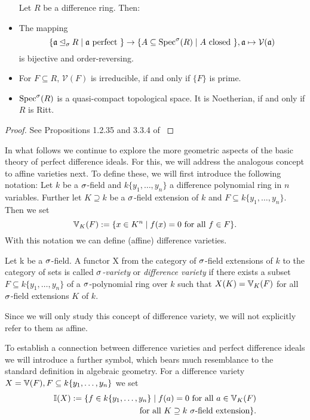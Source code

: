 \begin{prop}
\begin{itemize}
Let $R$ be a difference ring. Then: 
\item The mapping $$\{ \mathfrak{a} \unlhd_{\sigma} R \mid \mathfrak{a}\text{ perfect }\} \rightarrow \{ A \subseteq \operatorname{Spec}^\sigma(R) \mid A \text{ closed }\}, \mathfrak{a} \mapsto \mathcal{V}(\mathfrak{a})$$
 is bijective and order-reversing.
\item For $F \subseteq R$,  $\mathcal{V}(F)$ is irreducible, if and only if $\{F\}$ is prime.
\item $\operatorname{Spec}^\sigma(R)$ is a quasi-compact topological space. It is Noetherian, if and only if $R$ is Ritt.
\end{itemize}
\begin{proof} See Propositions 1.2.35 and 3.3.4 of \cite{wibmer} \end{proof}
\end{prop}

In what follows we continue to explore the more geometric aspects of the basic theory of perfect difference ideals.
For this, we will address the analogous concept to affine varieties next. To define these, we will first introduce the following notation:
Let $k$ be a $\sigma$-field and $k\{y_1,\ldots,y_n\}$ a difference polynomial ring in $n$ variables. Further let $K \supseteq k$ be a $\sigma$-field extension of $k$ and $F \subseteq k\{y_1,\ldots,y_n\}$.
Then we set $$\mathbb{V}_K(F) := \{ x \in K^n \mid f(x) = 0 \text{ for all } f \in F \}.$$
With this notation we can define (affine) difference varieties.

\begin{defn}
Let k be a $\sigma$-field. A functor X from the category of $\sigma$-field extensions of $k$ to the category of sets is called \emph{$\sigma$-variety} or \emph{difference variety} 
 if there exists a subset $F \subseteq k\{y_1,\ldots,y_n\}$ of a $\sigma$-polynomial ring over $k$ such that $X(K) = \mathbb{V}_K(F)$ for all $\sigma$-field extensions $K$ of $k$.
\end{defn}

Since we will only study this concept of difference variety, we will not explicitly refer to them as affine.

To establish a connection between difference varieties and perfect difference ideals we will introduce a further symbol, which bears much resemblance to the standard definition in algebraic geometry.
For a difference variety $X = \mathbb{V}(F), F \subseteq k\{y_1,\ldots,y_n\}$ we set 
\begin{align*} \mathbb{I}(X) := \{ f \in k\{y_1,\ldots,y_n \} \mid f(a) = 0 \text{ for all } a \in \mathbb{V}_K(F) \\ \text{ for all } K \supseteq k ~ \sigma \text{-field extension} \}. \end{align*}

